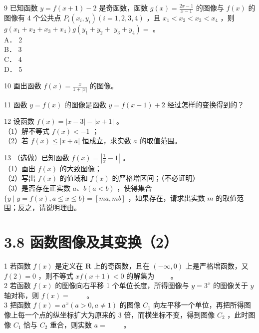 \documentclass[10pt]{article}
\begin{document}
9 已知函数 \(y=f(x+1)-2\) 是奇函数，函数 \(g(x)=\frac{2 x-1}{x-1}\) 的图像与 \(f(x)\) 的图像有 4 个公共点 \(P_{i}\left(x_{i}, y_{i}\right)(i=1,2,3,4)\) ，且 \(x_{1}<x_{2}<x_{3}<x_{4}\) ，则 \(g\left(x_{1}+x_{2}+x_{3}+x_{4}\right) g\left(y_{1}+y_{2}+\right.\) \(\left.y_{3}+y_{4}\right)=\) 。\\
A． 2\\
B． 3\\
C． 4\\
D． 5

10 画出函数 \(f(x)=\frac{x}{1+|x|}\) 的图像。

11 函数 \(y=f(x)\) 的图像是函数 \(y=f(x-1)+2\) 经过怎样的变换得到的？

12 设函数 \(f(x)=|x-3|-|x+1|\) 。\\
（1）解不等式 \(f(x)<-1\) ；\\
（2）若 \(f(x) \leqslant|x+a|\) 恒成立，求实数 \(a\) 的取值范围。

13 （选做）已知函数 \(f(x)=\left|\frac{1}{x}-1\right|\) 。\\
（1）画出 \(f(x)\) 的大致图像；\\
（2）写出 \(f(x)\) 的值域和 \(f(x)\) 的严格增区间；（不必证明）\\
（3）是否存在正实数 \(a 、 b(a<b)\) ，使得集合 \(\{y \mid y=f(x), a \leqslant x \leqslant b\}=[m a, m b]\) ，如果存在，请求出实数 \(m\) 的取值范围；反之，请说明理由。

\section*{3.8 函数图像及其变换（2）}
1 若函数 \(f(x)\) 是定义在 \(\mathbf{R}\) 上的奇函数，且在 \((-\infty, 0)\) 上是严格增函数，又 \(f(2)=0\) ，则不等式 \(x f(x+1)<0\) 的解集为 \(\qquad\)。\\
2 若函数 \(f(x)\) 的图像向右平移 1 个单位长度，所得图像与 \(y=3^{x}\) 的图像关于 \(y\) 轴对称，则 \(f(x)=\) \(\qquad\)。\\
3 把函数 \(f(x)=a^{x}(a>0, a \neq 1)\) 的图像 \(C_{1}\) 向左平移一个单位，再把所得图像上每一个点的纵坐标扩大为原来的 3 倍，而横坐标不变，得到图像 \(C_{2}\) ，此时图像 \(C_{1}\) 恰与 \(C_{2}\) 重合，则实数 \(a=\) \(\qquad\)。
\end{document}
